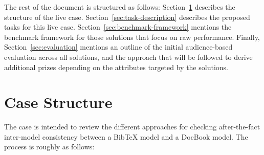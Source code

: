\documentclass[a4paper]{article}
\begin{document}
The rest of the document is structured as follows:
Section~\ref{sec:case-structure} describes the structure of the live case.
Section~\ref{sec:task-description} describes the proposed tasks for this live
case. Section~\ref{sec:benchmark-framework} mentions the benchmark framework for
those solutions that focus on raw performance. Finally,
Section~\ref{sec:evaluation} mentions an outline of the initial audience-based
evaluation across all solutions, and the approach that will be followed to
derive additional prizes depending on the attributes targeted by the solutions.

\section{Case Structure}
\label{sec:case-structure}

The case is intended to review the different approaches for checking
after-the-fact inter-model consistency between a BibTeX model and a DocBook
model. The process is roughly as follows:
\end{document}
